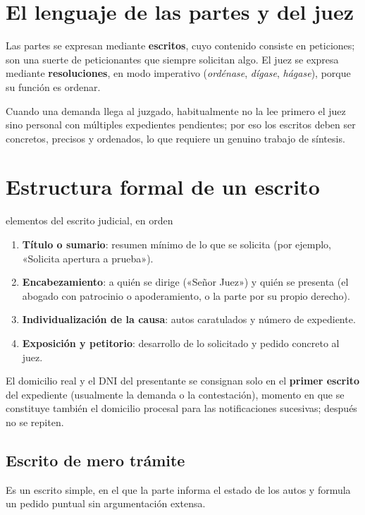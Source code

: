 \documentclass[12pt,oneside]{book}
\begin{document}
\section{El lenguaje de las partes y del juez}

Las partes se expresan mediante \textbf{escritos}, cuyo contenido consiste en peticiones; son una suerte de peticionantes que siempre solicitan algo. El juez se expresa mediante \textbf{resoluciones}, en modo imperativo (\emph{ordénase}, \emph{dígase}, \emph{hágase}), porque su función es ordenar.

Cuando una demanda llega al juzgado, habitualmente no la lee primero el juez sino personal con múltiples expedientes pendientes; por eso los escritos deben ser concretos, precisos y ordenados, lo que requiere un genuino trabajo de síntesis.

\section{Estructura formal de un escrito}

\begin{regla}{elementos del escrito judicial, en orden}
\begin{enumerate}
\item \textbf{Título o sumario}: resumen mínimo de lo que se solicita (por ejemplo, «Solicita apertura a prueba»).
\item \textbf{Encabezamiento}: a quién se dirige («Señor Juez») y quién se presenta (el abogado con patrocinio o apoderamiento, o la parte por su propio derecho).
\item \textbf{Individualización de la causa}: autos caratulados y número de expediente.
\item \textbf{Exposición y petitorio}: desarrollo de lo solicitado y pedido concreto al juez.
\end{enumerate}
\end{regla}

El domicilio real y el DNI del presentante se consignan solo en el \textbf{primer escrito} del expediente (usualmente la demanda o la contestación), momento en que se constituye también el domicilio procesal para las notificaciones sucesivas; después no se repiten.

\subsection{Escrito de mero trámite}

Es un escrito simple, en el que la parte informa el estado de los autos y formula un pedido puntual sin argumentación extensa.
\end{document}
